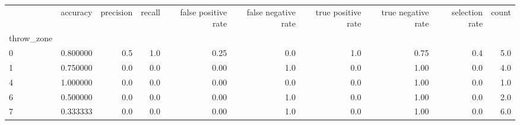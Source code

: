 \begin{tabular}{lrrrrrrrrr}
\toprule
{} &  accuracy &  precision &  recall &  false positive rate &  false negative rate &  true positive rate &  true negative rate &  selection rate &  count \\
throw\_zone &           &            &         &                      &                      &                     &                     &                 &        \\
\midrule
0          &  0.800000 &        0.5 &     1.0 &                 0.25 &                  0.0 &                 1.0 &                0.75 &             0.4 &    5.0 \\
1          &  0.750000 &        0.0 &     0.0 &                 0.00 &                  1.0 &                 0.0 &                1.00 &             0.0 &    4.0 \\
4          &  1.000000 &        0.0 &     0.0 &                 0.00 &                  0.0 &                 0.0 &                1.00 &             0.0 &    1.0 \\
6          &  0.500000 &        0.0 &     0.0 &                 0.00 &                  1.0 &                 0.0 &                1.00 &             0.0 &    2.0 \\
7          &  0.333333 &        0.0 &     0.0 &                 0.00 &                  1.0 &                 0.0 &                1.00 &             0.0 &    6.0 \\
\bottomrule
\end{tabular}

